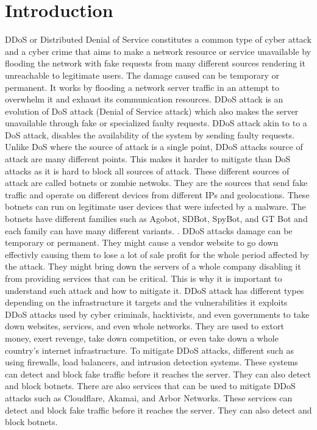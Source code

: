 \documentclass[a4paper, 12pt]{report} %
\begin{document}
    \section{Introduction}
        DDoS or Distributed Denial of Service constitutes a common type of cyber attack and a cyber crime that aims to make a network resource or service unavailable by flooding the network with fake requests from many different sources rendering it unreachable to legitimate users. The damage caused can be temporary or permanent. It works by flooding a network server traffic in an attempt to overwhelm it and exhaust its communication resources. DDoS attack is an evolution of DoS attack (Denial of Service attack) which also makes the server unavailable through fake or specialized faulty requests. DDoS attack akin to to a DoS attack, disables the availability of the system by sending faulty requests. Unlike DoS where the source of attack is a single point, DDoS attacks source of attack are many different points. This makes it harder to mitigate than DoS attacks as it is hard to block all sources of attack. These different sources of attack are called botnets or zombie netwoks. They are the sources that send fake traffic and operate on different devices from different IPs and geolocations. These botnets can run on legitimate user devices that were infected by a malware. The botnets have different families such as Agobot, SDBot, SpyBot, and GT Bot \cite{10.1007/978-0-387-44599-1_8} and each family can have many different variants. \cite{ddos_evolution}.
        DDoS attacks damage can be temporary or permanent. They might cause a vendor website to go down effectivly causing them to lose a lot of sale profit for the whole period affected by the attack. They might bring down the servers of a whole company disabling it from providing services that can be critical. This is why it is important to understand such attack and how to mitigate it.
        DDoS attack has different types depending on the infrastructure it targets and the vulnerabilities it exploits %
        DDoS attacks used by cyber criminals, hacktivists, and even governments to take down websites, services, and even whole networks. They are used to extort money, exert revenge, take down competition, or even take down a whole country's internet infrastructure.
        To mitigate DDoS attacks, different such as using firewalls, load balancers, and intrusion detection systems. These systems can detect and block fake traffic before it reaches the server. They can also detect and block botnets. There are also services that can be used to mitigate DDoS attacks such as Cloudflare, Akamai, and Arbor Networks. These services can detect and block fake traffic before it reaches the server. They can also detect and block botnets.
\end{document}
